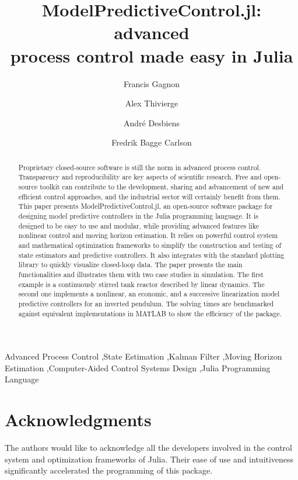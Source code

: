 \documentclass[5p,authoryear]{elsarticle}
\begin{document}
\begin{frontmatter}

\title{ModelPredictiveControl.jl: advanced\\process control made easy in Julia}

\author[jumine]{Francis Gagnon}
\author[jumine]{Alex Thivierge}
\author[loop]{André Desbiens}
\author[juliahub]{Fredrik Bagge Carlson}

\address[jumine]{Jumine, Quebec City, Canada}
\address[loop]{Process Observation and Optimization Laboratory (LOOP), Université Laval, Quebec City, Canada}
\address[juliahub]{JuliaHub, Lund, Sweden}

\begin{abstract}
Proprietary closed-source software is still the norm in advanced process control. Transparency and reproducibility are key aspects of scientific research. Free and open-source toolkit can contribute to the development, sharing and advancement of  new and efficient control approaches, and the industrial sector will certainly benefit from them. This paper presents ModelPredictiveControl.jl, an open-source software package for designing model predictive controllers in the Julia programming language. It is designed to be easy to use and modular, while providing advanced features like nonlinear control and moving horizon estimation. It relies on powerful control system and mathematical optimization frameworks to simplify the construction and testing of state estimators and predictive controllers. It also integrates with the standard plotting library to quickly visualize closed-loop data. The paper presents the main functionalities and illustrates them with two case studies in simulation. The first example is a continuously stirred tank reactor described by linear dynamics. The second one implements a nonlinear, an economic, and a successive linearization model predictive controllers for an inverted pendulum. The solving times are benchmarked against equivalent implementations in MATLAB to show the efficiency of the package.
\end{abstract}
    

\begin{keyword}
Advanced Process Control \sep State Estimation \sep Kalman Filter \sep Moving Horizon Estimation \sep Computer-Aided Control Systems Design \sep Julia Programming Language
\end{keyword}

\end{frontmatter}





%
\section*{Acknowledgments}
The authors would like to acknowledge all the developers involved in the control system and optimization frameworks of Julia. Their ease of use and intuitiveness  significantly accelerated the programming of this package. 


 
\end{document}

